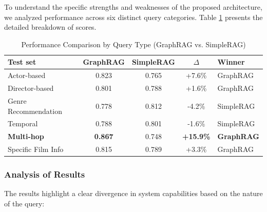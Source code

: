 \documentclass[a4paper, 12pt]{extreport}
\begin{document}
To understand the specific strengths and weaknesses of the proposed architecture, we analyzed performance across six distinct query categories. Table \ref{tab:query_type_performance} presents the detailed breakdown of scores.

\begin{table}[H]
\centering
\caption{Performance Comparison by Query Type (GraphRAG vs. SimpleRAG)}
\label{tab:query_type_performance}
\begin{tabular}{lcccl}
\toprule
\textbf{Test set} & \textbf{GraphRAG} & \textbf{SimpleRAG} & \textbf{$\Delta$} & \textbf{Winner} \\ \midrule
Actor-based & 0.823 & 0.765 & +7.6\% & GraphRAG \\ 
Director-based & 0.801 & 0.788 & +1.6\% & GraphRAG \\ 
Genre Recommendation & 0.778 & 0.812 & -4.2\% & SimpleRAG \\ 
Temporal & 0.788 & 0.801 & -1.6\% & SimpleRAG \\ 
\textbf{Multi-hop} & \textbf{0.867} & 0.748 & \textbf{+15.9\%} & \textbf{GraphRAG} \\ 
Specific Film Info & 0.815 & 0.789 & +3.3\% & GraphRAG \\ \bottomrule
\end{tabular}
\end{table}



\subsubsection{Analysis of Results}
The results highlight a clear divergence in system capabilities based on the nature of the query:
\end{document}
